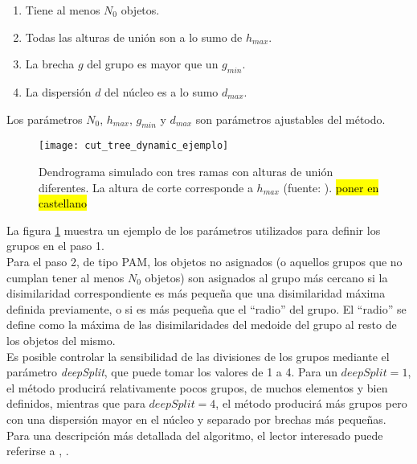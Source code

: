 \begin{enumerate}
\item Tiene al menos $N_0$ objetos.
\item Todas las alturas de unión son a lo sumo de $h_{max}$.
\item La brecha $g$ del grupo es mayor que un $g_{min}$.
\item La dispersión $d$ del núcleo es a lo sumo $d_{max}$.
\end{enumerate}
Los parámetros $N_0$, $h_{max}$, $g_{min}$ y $d_{max}$ son parámetros ajustables del método.
\begin{figure}[h]
    \centering
    \texttt{[image: cut\_tree\_dynamic\_ejemplo]}
    \caption{Dendrograma simulado con tres ramas con alturas de unión diferentes. La altura de corte corresponde a $h_{max}$ (fuente: \cite{Langfelder2008}). \hl{poner en castellano}}
    \label{fig:cut_tree_dynamic_ejemplo}
\end{figure}
La figura \ref{fig:cut_tree_dynamic_ejemplo} muestra un ejemplo de los parámetros utilizados para definir los grupos en el paso 1.\\
Para el paso 2, de tipo PAM, los objetos no asignados (o aquellos grupos que no cumplan tener al menos $N_0$ objetos) son asignados al grupo más cercano si la disimilaridad correspondiente es más pequeña que una disimilaridad máxima definida previamente, o si es más pequeña que el ``radio'' del grupo. El ``radio'' se define como la máxima de las disimilaridades del medoide del grupo al resto de los objetos del mismo.\\
Es posible controlar la sensibilidad de las divisiones de los grupos mediante el parámetro \textit{deepSplit}, que puede tomar los valores de 1 a 4. Para un $deepSplit=1$, el método producirá relativamente pocos grupos, de muchos elementos y bien definidos, mientras que para $deepSplit=4$, el método producirá más grupos pero con una dispersión mayor en el núcleo y separado por brechas más pequeñas.\\
Para una descripción más detallada del algoritmo, el lector interesado puede referirse a \cite{Langfelder2008}, \cite{Langfelder2007}.

